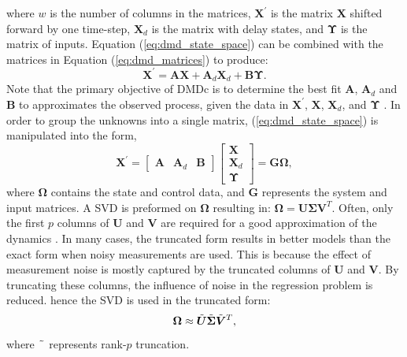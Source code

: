         where $w$ is the number of columns in the matrices, 
        $\bm{X^\prime}$ is the matrix $\bm{X}$ shifted forward by one time-step, 
        $\bm{X}_d$ is the matrix with delay states, 
        and $\bm{\Upsilon}$ is the matrix of inputs.
        Equation (\ref{eq:dmd_state_space}) can be combined with the matrices in Equation (\ref{eq:dmd_matrices}) to produce:
        \begin{equation}
            \bm{X^\prime} = \bm{A} \bm{X} + \bm{A}_d \bm{X}_d + \bm{B} \bm{\Upsilon} .
        \end{equation}
        Note that the primary objective of DMDc is to determine the best fit $\bm{A}$, $\bm{A}_d$ and $\bm{B}$ to approximates the observed process, 
        given the data in $\bm{X^\prime}$, $\bm{X}$, $\bm{X}_d$, and $\bm{\Upsilon}$ \cite{Proctor2016c}.
        In order to group the unknowns into a single matrix, (\ref{eq:dmd_state_space}) is manipulated into the form,
        \begin{equation} \label{eq:G_Omega}
            \bm{X^\prime} =   
            \begin{bmatrix} 
                \bm{A} & \bm{A}_d & \bm{B} 
            \end{bmatrix}
            \begin{bmatrix} 
                \bm{X} \\ \bm{X}_d \\ \bm{\Upsilon} 
            \end{bmatrix} 
            = \bm{G \Omega} ,
        \end{equation} 
        where $\bm{\Omega}$ contains the state and control data, and $\bm{G}$ represents the system and input matrices.
        A SVD is preformed on $\bm{\Omega}$ resulting in:
        \(
            \bm{\Omega} = \bm{U} \bm{\Sigma} \bm{V}^T
        \).
        Often, only the first $p$ columns of $\bm{U}$ and $\bm{V}$ are required for a good approximation of the dynamics \cite{Brunton2017}.
        In many cases, the truncated form results in better models than the exact form when noisy measurements are used.
        This is because the effect of measurement noise is mostly captured by the truncated columns of $\bm{U}$ and $\bm{V}$.
        By truncating these columns, the influence of noise in the regression problem is reduced. 
        hence the SVD is used in the truncated form: 
        \begin{equation} \label{eq:tilde_svd}
            \bm{\Omega} \approx \Tilde{\bm{U}} \Tilde{\bm{\Sigma}} \Tilde{\bm{V}}^T ,
        \end{equation}
        where $\phantom{.} \Tilde{ } \phantom{.}$ represents rank-$p$ truncation.
    
